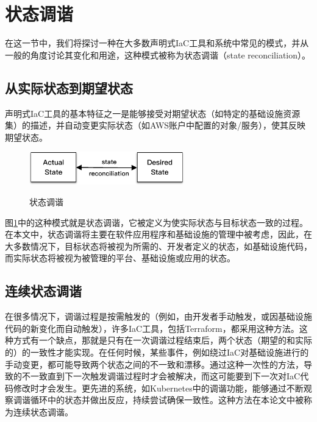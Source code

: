 \documentclass[macfonts,master]{njuthesis}
\begin{document}
\section{状态调谐}\label{section:reconciliation}

在这一节中，我们将探讨一种在大多数声明式IaC工具和系统中常见的模式，并从一般的角度讨论其变化和用途，这种模式被称为状态调谐（state reconciliation）。

\subsection{从实际状态到期望状态}

声明式IaC工具的基本特征之一是能够接受对期望状态（如特定的基础设施资源集）的描述，并自动变更实际状态（如AWS账户中配置的对象/服务），使其反映期望状态。

\begin{figure}[htbp]
  \centering
  \includegraphics[width=0.6\textwidth]{pics/simple-state-reconciliation.pdf}\\
  \caption{状态调谐}\label{fig:ssr}
\end{figure}

图\ref{fig:ssr}中的这种模式就是状态调谐，它被定义为使实际状态与目标状态一致的过程。在本文中，状态调谐将主要在软件应用程序和基础设施的管理中被考虑，因此，在大多数情况下，目标状态将被视为所需的、开发者定义的状态，如基础设施代码，而实际状态将被视为被管理的平台、基础设施或应用的状态。

\subsection{连续状态调谐}\label{section:continus-reconciliation}

在很多情况下，调谐过程是按需触发的（例如，由开发者手动触发，或因基础设施代码的新变化而自动触发），许多IaC工具，包括Terraform，都采用这种方法。这种方式有一个缺点，那就是只有在一次调谐过程结束后，两个状态（期望的和实际的）的一致性才能实现。在任何时候，某些事件，例如绕过IaC对基础设施进行的手动变更，都可能导致两个状态之间的不一致和漂移。通过这种一次性的方法，导致的不一致直到下一次触发调谐过程时才会被解决，而这可能要到下一次对IaC代码修改时才会发生。更先进的系统，如Kubernetes中的调谐功能，能够通过不断观察调谐循环中的状态并做出反应，持续尝试确保一致性。这种方法在本论文中被称为连续状态调谐。
\end{document}

